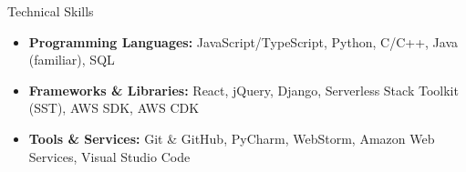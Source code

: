 \documentclass[]{mcdowellcv}
\begin{document}
	\begin{cvsection}{Technical Skills}
		\begin{cvsubsection}{}{}{}
			\begin{itemize}
				\item \textbf{Programming Languages:} JavaScript/TypeScript, Python, C/C++, Java (familiar), SQL
				\item \textbf{Frameworks \& Libraries:} React, jQuery, Django, Serverless Stack Toolkit (SST), AWS SDK, AWS CDK
				\item \textbf{Tools \& Services:} Git \& GitHub, PyCharm, WebStorm, Amazon Web Services, Visual Studio Code
			\end{itemize}
		\end{cvsubsection}
	\end{cvsection}
	
\end{document}
